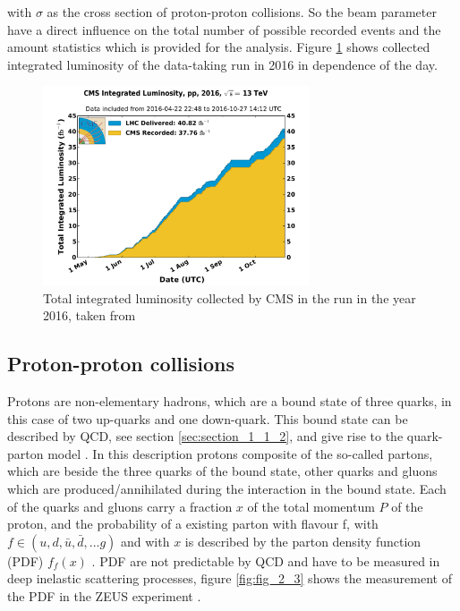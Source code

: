 with $\sigma$ as the cross section of proton-proton collisions. So the beam parameter have a direct influence on the total number of possible recorded events and the amount statistics which is provided for the analysis. Figure \ref{fig:fig_2_2} shows collected integrated luminosity of the data-taking run in 2016 in dependence of the day. 

\begin{figure}[ht]
	\centering
	\includegraphics[width=0.7\textwidth]{pictures/int_lumi_per_day_cumulative_pp_2016.pdf}

	\caption[Total integrated luminosity of the year 2016]{Total integrated luminosity collected by \gls{CMS} in the run in the year 2016, taken from \cite{CMSLUMI}}
	\label{fig:fig_2_2}
\end{figure}


\subsection{Proton-proton collisions}
\label{sec:section_2_1_2}

Protons are non-elementary hadrons, which are a bound state of three quarks, in this case of two up-quarks and one down-quark. This bound state can be described by \gls{QCD}, see section \ref{sec:section_1_1_2}, and give rise to the quark-parton model \cite{Peskin}. In this description protons composite of the so-called partons, which are beside the three quarks of the bound state, other quarks and gluons which are produced/annihilated during the interaction in the bound state. Each of the quarks and gluons carry a fraction $x$ of the total momentum $P$ of the proton, and the probability of a existing parton with flavour f, with $f \in (u, d, \bar{u}, \bar{d}, ... g)$ and with $x$ is described by the parton density function (\gls{PDF}) $f_{f}(x)$ \cite{Peskin, PDF1}. \gls{PDF} are not predictable by \gls{QCD} and have to be measured in deep inelastic scattering processes, figure \ref{fig:fig_2_3} shows the measurement of the \gls{PDF} in the ZEUS experiment \cite{ZEUS}. \\

